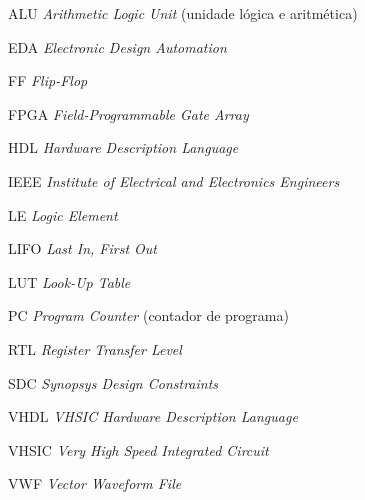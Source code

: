 \listoffigures*
\cleardoublepage
{}
\listoftables*
\cleardoublepage
{}
\listofcodigos*
\cleardoublepage
\begin{siglas}

  \item[ALU] \textit {Arithmetic Logic Unit} (unidade lógica e aritmética)
  \item [EDA] \textit {Electronic Design Automation}
  \item [FF] \textit {Flip-Flop}
  \item [FPGA] \textit {Field-Programmable Gate Array}
  \item [HDL] \textit {Hardware Description Language}
  \item [IEEE] \textit {Institute of Electrical and Electronics Engineers}
  \item [LE] \textit {Logic Element}
  \item [LIFO] \textit {Last In, First Out}
  \item [LUT] \textit {Look-Up Table}
  \item [PC] \textit {Program Counter} (contador de programa)
  \item [RTL] \textit {Register Transfer Level}
  \item [SDC] \textit {Synopsys Design Constraints}
  \item [VHDL] \textit {VHSIC Hardware Description Language}
  \item [VHSIC] \textit {Very High Speed Integrated Circuit}
  \item [VWF] \textit {Vector Waveform File}

\end{siglas}
\cleardoublepage
